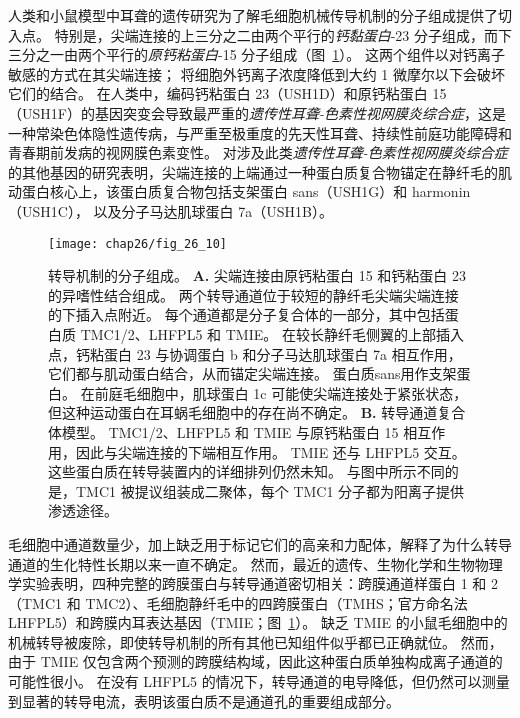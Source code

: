 人类和小鼠模型中耳聋的遗传研究为了解毛细胞机械传导机制的分子组成提供了切入点。
特别是，尖端连接的上三分之二由两个平行的\textit{钙黏蛋白}-23 分子组成，而下三分之一由两个平行的\textit{原钙粘蛋白}-15 分子组成（图~\ref{fig:26_10}）。
这两个组件以对钙离子敏感的方式在其尖端连接；
将细胞外钙离子浓度降低到大约 1 微摩尔以下会破坏它们的结合。
在人类中，编码钙粘蛋白 23（USH1D）和原钙粘蛋白 15（USH1F）的基因突变会导致最严重的\textit{遗传性耳聋-色素性视网膜炎综合症}，这是一种常染色体隐性遗传病，与严重至极重度的先天性耳聋、持续性前庭功能障碍和 青春期前发病的视网膜色素变性。
对涉及此类\textit{遗传性耳聋-色素性视网膜炎综合症}的其他基因的研究表明，尖端连接的上端通过一种蛋白质复合物锚定在静纤毛的肌动蛋白核心上，该蛋白质复合物包括支架蛋白 sans（USH1G）和 harmonin（USH1C）， 以及分子马达肌球蛋白 7a（USH1B）。


\begin{figure}[htbp]
	\centering
	\texttt{[image: chap26/fig\_26\_10]}
	\caption{转导机制的分子组成。
		\textbf{A.} 尖端连接由原钙粘蛋白 15 和钙粘蛋白 23 的异嗜性结合组成。
		两个转导通道位于较短的静纤毛尖端尖端连接的下插入点附近。
		每个通道都是分子复合体的一部分，其中包括蛋白质 TMC1/2、LHFPL5 和 TMIE。
		在较长静纤毛侧翼的上部插入点，钙粘蛋白 23 与协调蛋白 b 和分子马达肌球蛋白 7a 相互作用，它们都与肌动蛋白结合，从而锚定尖端连接。
		蛋白质sans用作支架蛋白。
		在前庭毛细胞中，肌球蛋白 1c 可能使尖端连接处于紧张状态，但这种运动蛋白在耳蜗毛细胞中的存在尚不确定。
		\textbf{B.} 转导通道复合体模型。
		TMC1/2、LHFPL5 和 TMIE 与原钙粘蛋白 15 相互作用，因此与尖端连接的下端相互作用。
		TMIE 还与 LHFPL5 交互。
		这些蛋白质在转导装置内的详细排列仍然未知。
		与图中所示不同的是，TMC1 被提议组装成二聚体，每个 TMC1 分子都为阳离子提供渗透途径\cite{wu2016molecular,pan2018tmc1}。}
	\label{fig:26_10}
\end{figure}


毛细胞中通道数量少，加上缺乏用于标记它们的高亲和力配体，解释了为什么转导通道的生化特性长期以来一直不确定。
然而，最近的遗传、生物化学和生物物理学实验表明，四种完整的跨膜蛋白与转导通道密切相关：跨膜通道样蛋白 1 和 2（TMC1 和 TMC2）、毛细胞静纤毛中的四跨膜蛋白（TMHS；官方命名法 LHFPL5）和跨膜内耳表达基因（TMIE；图~\ref{fig:26_10}）。
缺乏 TMIE 的小鼠毛细胞中的机械转导被废除，即使转导机制的所有其他已知组件似乎都已正确就位。
然而，由于 TMIE 仅包含两个预测的跨膜结构域，因此这种蛋白质单独构成离子通道的可能性很小。
在没有 LHFPL5 的情况下，转导通道的电导降低，但仍然可以测量到显著的转导电流，表明该蛋白质不是通道孔的重要组成部分。


